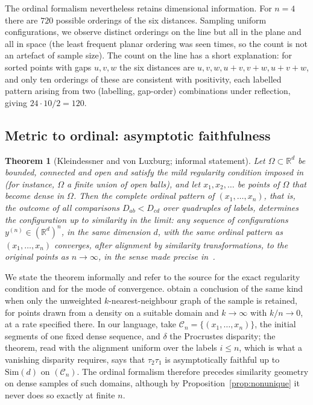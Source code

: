\documentclass[11pt,a4paper]{article}
\theoremstyle{plain}
\newtheorem{theorem}{Theorem}[section]
\theoremstyle{definition}
\theoremstyle{remark}
\newcommand{\R}{\mathbb{R}}
\newcommand{\Sim}{\mathrm{Sim}}
\begin{document}
The ordinal formalism nevertheless retains dimensional information. For $n=4$ there are $720$ possible orderings of the six distances. Sampling \EthreeSamples{} uniform configurations, we observe \EthreePatternsDone{} distinct orderings on the line but all \EthreePatternsDtwo{} in the plane and all \EthreePatternsDthree{} in space (the least frequent planar ordering was seen \EthreeLeastDtwo{} times, so the count is not an artefact of sample size). The count on the line has a short explanation: for sorted points with gaps $u,v,w$ the six distances are $u,v,w,u+v,v+w,u+v+w$, and only ten orderings of these are consistent with positivity, each labelled pattern arising from two (labelling, gap-order) combinations under reflection, giving $24\cdot10/2=120$.

\subsection{Metric to ordinal: asymptotic faithfulness}

\begin{theorem}[Kleindessner and von Luxburg; informal statement]\label{thm:kvl}
Let $\Omega\subset\R^d$ be bounded, connected and open and satisfy the mild regularity condition imposed in~\citet{kleindessner2014} (for instance, $\Omega$ a finite union of open balls), and let $x_1,x_2,\dots$ be points of $\Omega$ that become dense in $\Omega$. Then the complete ordinal pattern of $(x_1,\dots,x_n)$, that is, the outcome of \emph{all} comparisons $D_{ab}<D_{cd}$ over quadruples of labels, determines the configuration up to similarity in the limit: any sequence of configurations $y^{(n)}\in(\R^d)^n$, in the same dimension $d$, with the same ordinal pattern as $(x_1,\dots,x_n)$ converges, after alignment by similarity transformations, to the original points as $n\to\infty$, in the sense made precise in~\citet{kleindessner2014}.
\end{theorem}
\noindent We state the theorem informally and refer to the source for the exact regularity condition and for the mode of convergence. \citet{terada2014} obtain a conclusion of the same kind when only the unweighted $k$-nearest-neighbour graph of the sample is retained, for points drawn from a density on a suitable domain and $k\to\infty$ with $k/n\to0$, at a rate specified there. In our language, take $\mathcal C_n=\{(x_1,\dots,x_n)\}$, the initial segments of one fixed dense sequence, and $\delta$ the Procrustes disparity; the theorem, read with the alignment uniform over the labels $i\le n$, which is what a vanishing disparity requires, says that $\tau_2\tau_1$ is asymptotically faithful up to $\Sim(d)$ on $(\mathcal C_n)$. The ordinal formalism therefore precedes similarity geometry on dense samples of such domains, although by Proposition~\ref{prop:nonunique} it never does so exactly at finite $n$.
\end{document}
